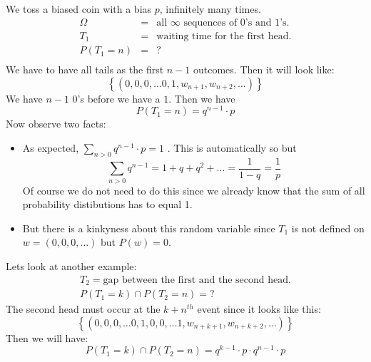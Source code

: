 We toss a biased coin with a bias $p$, infinitely many times. 
\begin{eqnarray*}
\Omega &=& \mbox{all } \infty \mbox{ sequences of } 0 \mbox{'s and } 1 \mbox{'s.} \\
T_1 &=& \mbox{waiting time for the first head.} \\
P(T_1=n) &=& ? \\
\end{eqnarray*} 
We have to have all tails as the first $n-1$ outcomes. Then it will
look like: 
\begin{equation}
\left\{ ( 0, 0, 0, \ldots 0, 1, w_{n+1}, w_{n+2}, \ldots) \right\}
\end{equation}
We have $n-1$ $0$'s before we have a $1$. Then we have 
\begin{equation}
P(T_1=n)= q^{n-1} \cdot p
\end{equation}
Now observe two facts:
\begin{itemize}{}{\setlength{\itemsep}{-2ex}}
\item As expected, $ \sum_{n>0}  q^{n-1} \cdot p =1 $ . This is
automatically so but 
\begin{equation}
\sum_{n>0}  q^{n-1} = 1+ q+q^2+ \ldots = \frac{1}{1-q} = \frac{1}{p}
\end{equation}
Of course we do not need to do this since we already know that the sum
of all probability distibutions has to equal 1.
\item But there is a kinkyness about this random variable since $T_1$
is not defined on $w=(0, 0, 0, \ldots)$ but $P(w)=0$. 
\end{itemize}
Lets look at another example:
\begin{eqnarray*}
T_2 = \mbox{gap between the first and the second head.} \\
P(T_1=k) \cap P(T_2=n)= ?
\end{eqnarray*} 
The second head must occur at the $k+n^{th}$ event since it looks like
this:
\begin{equation}
\left\{ ( 0, 0, 0, \ldots 0, 1, 0, 0, \ldots 1,  w_{n+k+1}, w_{n+k+2}, \ldots) \right\}
\end{equation}
Then we will have:
\begin{equation}
P(T_1=k) \cap P(T_2=n)= q^{k-1} \cdot p \cdot q^{n-1} \cdot p  
\end{equation}

